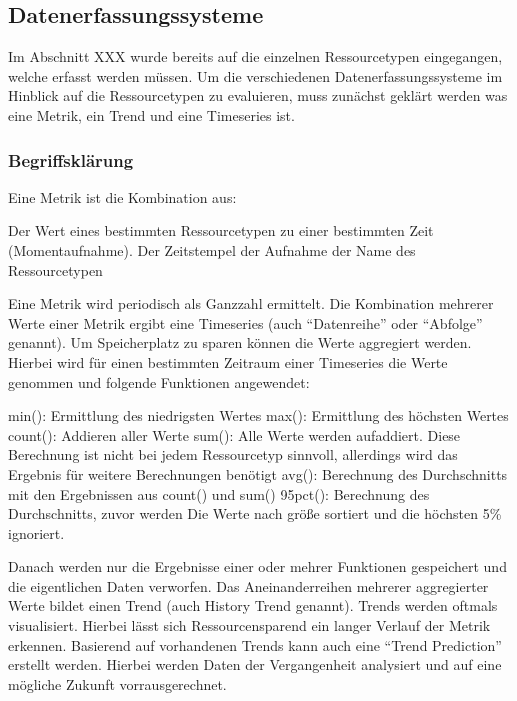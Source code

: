 \subsection{Datenerfassungssysteme}
Im Abschnitt XXX wurde bereits auf die einzelnen Ressourcetypen eingegangen,
welche erfasst werden müssen. Um die verschiedenen Datenerfassungssysteme im
Hinblick auf die Ressourcetypen zu evaluieren, muss zunächst geklärt werden was
eine Metrik, ein Trend und eine Timeseries ist.

\subsubsection{Begriffsklärung}
\label{subsubsection:Begriffserklärung}
Eine Metrik ist die Kombination aus:

\begin{outline}
  \1 Der Wert eines bestimmten Ressourcetypen zu einer bestimmten Zeit
  (Momentaufnahme).
  \1 Der Zeitstempel der Aufnahme
  \1 der Name des Ressourcetypen
\end{outline}

Eine Metrik wird periodisch als Ganzzahl ermittelt. Die Kombination mehrerer
Werte einer Metrik ergibt eine Timeseries (auch ``Datenreihe'' oder ``Abfolge''
genannt). Um Speicherplatz zu sparen können die Werte aggregiert werden.
Hierbei wird für einen bestimmten Zeitraum einer Timeseries die Werte genommen
und folgende Funktionen angewendet:

\begin{outline}
  \1 min(): Ermittlung des niedrigsten Wertes
  \1 max(): Ermittlung des höchsten Wertes
  \1 count(): Addieren aller Werte
  \1 sum(): Alle Werte werden aufaddiert. Diese Berechnung ist nicht bei jedem
  Ressourcetyp sinnvoll, allerdings wird das Ergebnis für weitere Berechnungen
  benötigt
  \1 avg(): Berechnung des Durchschnitts mit den Ergebnissen aus count() und
  sum()
  \1 95pct(): Berechnung des Durchschnitts, zuvor werden Die Werte nach größe
  sortiert und die höchsten 5\% ignoriert.
\end{outline}

Danach werden nur die Ergebnisse einer oder mehrer Funktionen gespeichert und
die eigentlichen Daten verworfen. Das Aneinanderreihen mehrerer aggregierter
Werte bildet einen Trend (auch History Trend genannt). Trends werden oftmals
visualisiert. Hierbei lässt sich Ressourcensparend ein langer Verlauf der
Metrik erkennen. Basierend auf vorhandenen Trends kann auch eine ``Trend
Prediction'' erstellt werden. Hierbei werden Daten der Vergangenheit analysiert
und auf eine mögliche Zukunft vorrausgerechnet.

